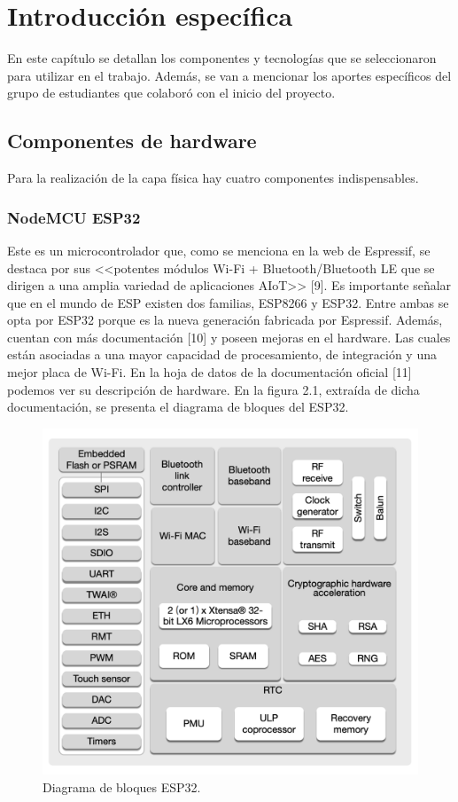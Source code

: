 \chapter{Introducción específica} %

En este capítulo se detallan los componentes y tecnologías que se seleccionaron para utilizar en el trabajo. Además, se van a mencionar los aportes específicos del grupo de estudiantes que colaboró con el inicio del proyecto.

\section{Componentes de hardware}
Para la realización de la capa física hay cuatro componentes indispensables.

\subsection{NodeMCU ESP32}
Este es un microcontrolador que, como se menciona en la web de Espressif, se destaca por sus <<potentes módulos Wi-Fi + Bluetooth/Bluetooth LE que se dirigen a una amplia variedad de aplicaciones AIoT>> [9]. Es importante señalar que en el mundo de ESP existen dos familias, ESP8266 y ESP32. Entre ambas se opta por ESP32 porque es la nueva generación fabricada por Espressif. Además, cuentan con más documentación [10] y poseen mejoras en el hardware. Las cuales están asociadas a una mayor capacidad de procesamiento, de integración y una mejor placa de Wi-Fi. En la hoja de datos de la documentación oficial [11] podemos ver su descripción de hardware. En la figura 2.1, extraída de dicha documentación, se presenta el diagrama de bloques del ESP32.

\begin{figure}[htpb]
\centering 
\includegraphics[width=.6\textwidth]{./Figures/esp32hardware.png}
\caption{Diagrama de bloques ESP32.}
\label{fig:diagBloques}
\end{figure}

